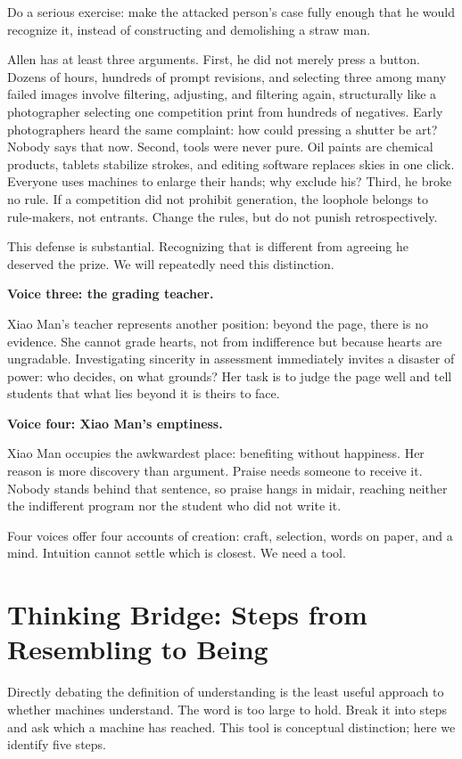 Do a serious exercise: make the attacked person's case fully enough that he would recognize it, instead of constructing and demolishing a straw man.

Allen has at least three arguments. First, he did not merely press a button. Dozens of hours, hundreds of prompt revisions, and selecting three among many failed images involve filtering, adjusting, and filtering again, structurally like a photographer selecting one competition print from hundreds of negatives. Early photographers heard the same complaint: how could pressing a shutter be art? Nobody says that now. Second, tools were never pure. Oil paints are chemical products, tablets stabilize strokes, and editing software replaces skies in one click. Everyone uses machines to enlarge their hands; why exclude his? Third, he broke no rule. If a competition did not prohibit generation, the loophole belongs to rule-makers, not entrants. Change the rules, but do not punish retrospectively.

This defense is substantial. Recognizing that is different from agreeing he deserved the prize. We will repeatedly need this distinction.

\textbf{Voice three: the grading teacher.}

Xiao Man's teacher represents another position: beyond the page, there is no evidence. She cannot grade hearts, not from indifference but because hearts are ungradable. Investigating sincerity in assessment immediately invites a disaster of power: who decides, on what grounds? Her task is to judge the page well and tell students that what lies beyond it is theirs to face.

\textbf{Voice four: Xiao Man's emptiness.}

Xiao Man occupies the awkwardest place: benefiting without happiness. Her reason is more discovery than argument. Praise needs someone to receive it. Nobody stands behind that sentence, so praise hangs in midair, reaching neither the indifferent program nor the student who did not write it.

Four voices offer four accounts of creation: craft, selection, words on paper, and a mind. Intuition cannot settle which is closest. We need a tool.

\section[From Resembling to Being]{Thinking Bridge: Steps from Resembling to Being}
Directly debating the definition of understanding is the least useful approach to whether machines understand. The word is too large to hold. Break it into steps and ask which a machine has reached. This tool is conceptual distinction; here we identify five steps.

